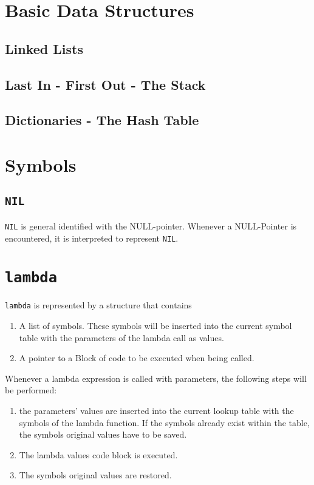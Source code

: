 \documentclass[12pt]{article}
\begin{document}
\section{Basic Data Structures}

\subsection{Linked Lists}

\subsection{Last In - First Out - The Stack}

\subsection{Dictionaries - The Hash Table}


\section{Symbols}

\subsection{\texttt{NIL}}

\texttt{NIL} is general identified with the NULL-pointer. Whenever a
NULL-Pointer is encountered, it is interpreted to represent \texttt{NIL}.


\section{\texttt{lambda}}

\texttt{lambda} is represented by a structure that contains 

\begin{enumerate}
\item A list of symbols. These symbols will be inserted into the current symbol
table with the parameters of the lambda call as values. 
\item A pointer to a Block of code to be executed when being called.
\end{enumerate}

Whenever a lambda expression is called with parameters, the following steps will
be performed:

\begin{enumerate}
\item  the parameters' values are inserted into the current lookup table  with the 
symbols of the lambda function. If the symbols already exist within the table,
the symbols original values have to be saved.
\item The lambda values code block is executed.
\item The symbols original values are restored.
\end{enumerate}
\end{document}
